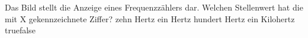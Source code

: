     {Das Bild stellt die Anzeige eines Frequenzzählers dar. Welchen Stellenwert hat die mit X gekennzeichnete Ziffer?}
    {zehn Hertz}
    {ein Hertz}
    {hundert Hertz}
    {ein Kilohertz}
    {true}{false}